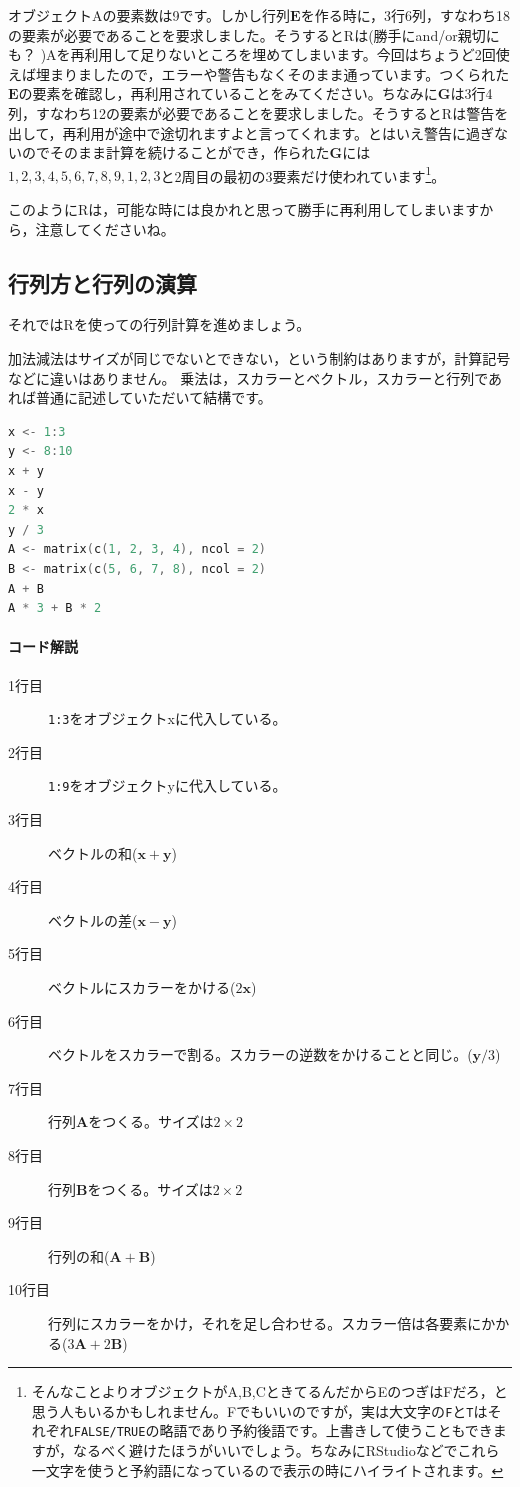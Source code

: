 \documentclass{ltjsbook}
\begin{document}
オブジェクトAの要素数は9です。しかし行列$\bm{E}$を作る時に，3行6列，すなわち18の要素が必要であることを要求しました。そうするとRは(勝手にand/or親切にも？ )Aを再利用して足りないところを埋めてしまいます。今回はちょうど2回使えば埋まりましたので，エラーや警告もなくそのまま通っています。つくられた$\bm{E}$の要素を確認し，再利用されていることをみてください。ちなみに$\bm{G}$は3行4列，すなわち12の要素が必要であることを要求しました。そうするとRは警告を出して，再利用が途中で途切れますよと言ってくれます。とはいえ警告に過ぎないのでそのまま計算を続けることができ，作られた$\bm{G}$には$1,2,3,4,5,6,7,8,9,1,2,3$と2周目の最初の3要素だけ使われています\footnote{そんなことよりオブジェクトがA,B,CときてるんだからEのつぎはFだろ，と思う人もいるかもしれません。Fでもいいのですが，実は大文字の\texttt{F}と\texttt{T}はそれぞれ\texttt{FALSE/TRUE}の略語であり予約後語です。上書きして使うこともできますが，なるべく避けたほうがいいでしょう。ちなみにRStudioなどでこれら一文字を使うと予約語になっているので表示の時にハイライトされます。}。

このようにRは，可能な時には良かれと思って勝手に再利用してしまいますから，注意してくださいね。
\subsection{行列方と行列の演算}
それではRを使っての行列計算を進めましょう。

加法減法はサイズが同じでないとできない，という制約はありますが，計算記号などに違いはありません。
乗法は，スカラーとベクトル，スカラーと行列であれば普通に記述していただいて結構です。

\begin{lstlisting}[language=c++,label={code::09_03},caption={ベクトルの和・差，スカラーをかける}]
x <- 1:3
y <- 8:10
x + y
x - y
2 * x
y / 3
A <- matrix(c(1, 2, 3, 4), ncol = 2)
B <- matrix(c(5, 6, 7, 8), ncol = 2)
A + B
A * 3 + B * 2
\end{lstlisting}
\paragraph{コード解説}
\begin{description}
    \item[1行目] \texttt{1:3}をオブジェクトxに代入している。
    \item[2行目] \texttt{1:9}をオブジェクトyに代入している。
    \item[3行目] ベクトルの和($\bm{x}+\bm{y}$)
    \item[4行目] ベクトルの差($\bm{x}-\bm{y}$)
    \item[5行目] ベクトルにスカラーをかける($2\bm{x}$)
    \item[6行目] ベクトルをスカラーで割る。スカラーの逆数をかけることと同じ。($\bm{y}/3$)
    \item[7行目] 行列$\bm{A}$をつくる。サイズは$2 \times 2$
    \item[8行目] 行列$\bm{B}$をつくる。サイズは$2 \times 2$
    \item[9行目] 行列の和($\bm{A}+\bm{B}$)
    \item[10行目] 行列にスカラーをかけ，それを足し合わせる。スカラー倍は各要素にかかる($3\bm{A}+2\bm{B}$)
\end{description}
\end{document}
